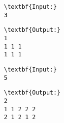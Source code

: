 \begin{verbatim}
\textbf{Input:}
3
\end{verbatim}
\begin{verbatim}
\textbf{Output:}
1
1 1 1
1 1 1\end{verbatim}
\begin{verbatim}
\textbf{Input:}
5
\end{verbatim}
\begin{verbatim}
\textbf{Output:}
2
1 1 2 2 2
2 1 2 1 2\end{verbatim}
